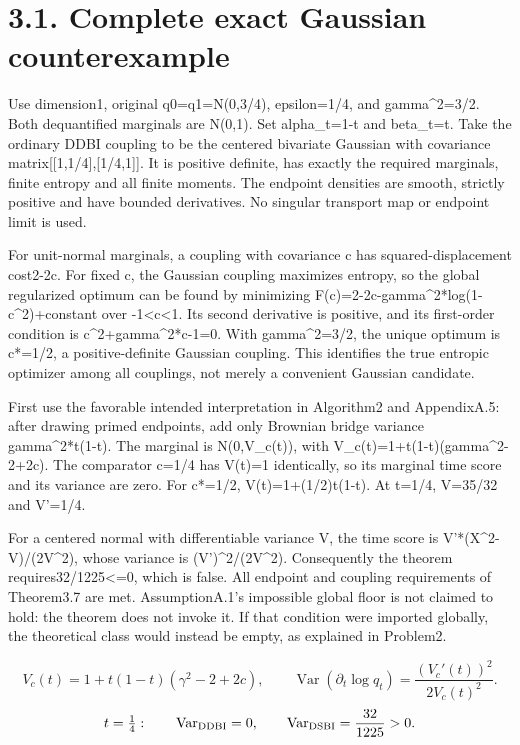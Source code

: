 \documentclass[10pt]{article}
\begin{document}
\section*{3.1. Complete exact Gaussian counterexample}
Use dimension1, original q0=q1=N(0,3/4), epsilon=1/4, and gamma\textasciicircum{}2=3/2. Both dequantified marginals are N(0,1). Set alpha\_t=1-t and beta\_t=t. Take the ordinary DDBI coupling to be the centered bivariate Gaussian with covariance matrix[[1,1/4],[1/4,1]]. It is positive definite, has exactly the required marginals, finite entropy and all finite moments. The endpoint densities are smooth, strictly positive and have bounded derivatives. No singular transport map or endpoint limit is used.\par
For unit-normal marginals, a coupling with covariance c has squared-displacement cost2-2c. For fixed c, the Gaussian coupling maximizes entropy, so the global regularized optimum can be found by minimizing F(c)=2-2c-gamma\textasciicircum{}2*log(1-c\textasciicircum{}2)+constant over -1<c<1. Its second derivative is positive, and its first-order condition is c\textasciicircum{}2+gamma\textasciicircum{}2*c-1=0. With gamma\textasciicircum{}2=3/2, the unique optimum is c*=1/2, a positive-definite Gaussian coupling. This identifies the true entropic optimizer among all couplings, not merely a convenient Gaussian candidate.\par
First use the favorable intended interpretation in Algorithm2 and AppendixA.5: after drawing primed endpoints, add only Brownian bridge variance gamma\textasciicircum{}2*t(1-t). The marginal is N(0,V\_c(t)), with V\_c(t)=1+t(1-t)(gamma\textasciicircum{}2-2+2c). The comparator c=1/4 has V(t)=1 identically, so its marginal time score and its variance are zero. For c*=1/2, V(t)=1+(1/2)t(1-t). At t=1/4, V=35/32 and V’=1/4.\par
For a centered normal with differentiable variance V, the time score is V’*(X\textasciicircum{}2-V)/(2V\textasciicircum{}2), whose variance is (V’)\textasciicircum{}2/(2V\textasciicircum{}2). Consequently the theorem requires32/1225<=0, which is false. All endpoint and coupling requirements of Theorem3.7 are met. AssumptionA.1’s impossible global floor is not claimed to hold: the theorem does not invoke it. If that condition were imported globally, the theoretical class would instead be empty, as explained in Problem2.\par
\[V_c(t)=1+t(1-t)(\gamma^2-2+2c),\qquad \operatorname{Var}(\partial_t\log q_t)=\frac{(V_c'(t))^2}{2V_c(t)^2}.\] \[t=\tfrac14:\qquad \operatorname{Var}_{\rm DDBI}=0,\qquad \operatorname{Var}_{\rm DSBI}=\frac{32}{1225}>0.\]\par
\end{document}
